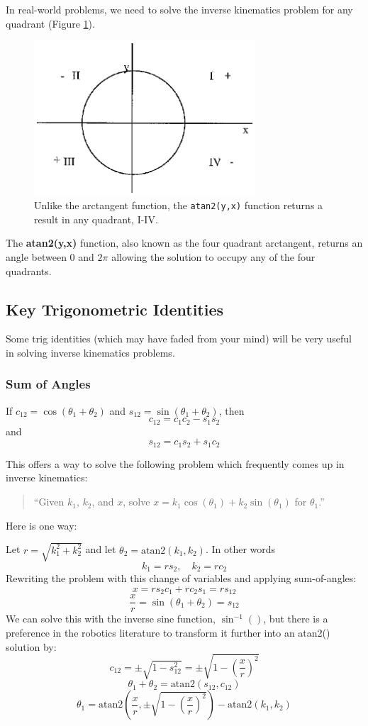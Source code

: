 In real-world problems, we need to solve the inverse kinematics problem for any quadrant (Figure \ref{atan2figure}).

\begin{figure}\centering
\includegraphics[width=3.25in]{figs04/00435.eps}
\caption{Unlike the arctangent function, the {\tt atan2(y,x)} function returns a result in any quadrant, I-IV.}\label{atan2figure}
\end{figure}


The {\bf atan2(y,x)} function, also known as the four quadrant arctangent, returns an angle between 0 and $2\pi$ allowing the solution to occupy any of the four quadrants.



\subsection{Key Trigonometric Identities}

Some trig identities (which may have faded from your mind) will be very useful in solving inverse kinematics problems.

\subsubsection{Sum of Angles}
If $c_{12} = \cos(\theta_1 + \theta_2)$ and $s_{12} = \sin(\theta_1 + \theta_2)$, then
\[
c_{12} = c_1 c_2 - s_1 s_2
\]
and
\[
s_{12} = c_1 s_2 + s_1 c_2
\]

This offers a way to solve   the following problem which frequently comes up in inverse kinematics:

\begin{quotation}
``Given $k_1$, $k_2$, and $x$, solve
$x = k_1\cos(\theta_1) + k_2\sin(\theta_1)$ for $\theta_1$.''
\end{quotation}

Here is one way:

Let $r = \sqrt{k_1^2 + k_2^2}$ and let $\theta_2 = \mathrm{atan2}(k_1,k_2)$.  In other words
\[
k_1 = rs_2, \quad k_2 = rc_2
\]
Rewriting the problem with this change of variables and applying sum-of-angles:
\[
x = rs_2c_1 + rc_2s_1 = rs_{12}
\]
\[
\frac{x}{r} = \sin(\theta_1 + \theta_2) = s_{12}
\]
We can solve this with the inverse sine function, $\sin^{-1}()$, but there is a preference in the robotics literature to transform it further into an atan2() solution by:
\[
c_{12} = \pm\sqrt{1-s^2_{12}} = \pm\sqrt{1-\left ( \frac{x}{r} \right)^2}
\]
\[
\theta_1 + \theta_2 = \mathrm{atan2}(s_{12}, c_{12})
\]
\[
\theta_1 = \mathrm{atan2}\left ( \frac{x}{r},  \pm\sqrt{1-\left ( \frac{x}{r} \right)^2} \right ) - \mathrm{atan2}(k_1,k_2)
\]

